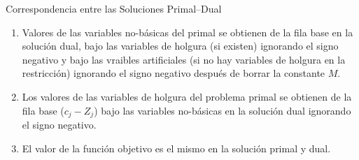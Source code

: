 \begin{frame}{Correspondencia entre las Soluciones Primal--Dual}

  \begin{enumerate} \justifying \parskip3mm
  \item Valores de las variables no-básicas del primal se obtienen de la fila base en la solución dual, bajo las variables de holgura (si existen) ignorando el signo negativo y bajo las vraibles artificiales (si no hay variables de holgura en la restricción) ignorando el signo negativo después de borrar la constante $M$.
  \item Los valores de las variables de holgura del problema primal se obtienen de la fila base ($c_j - Z_j$) bajo las variables no-básicas en la solución dual ignorando el signo negativo.
  \item El valor de la función objetivo es el mismo en la solución primal y dual.
  \end{enumerate}
\end{frame}





